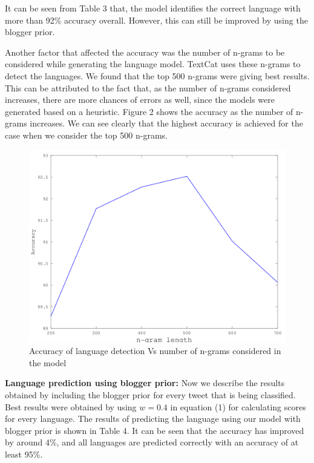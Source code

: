 \documentclass[11pt]{article}
\begin{document}
It can be seen from Table 3 that, the model identifies the correct language with more than 92\% accuracy overall. However, this can still be improved by using the blogger prior.

Another factor that affected the accuracy was the number of n-grams to be considered while generating the language model. TextCat uses these n-grams to detect the languages. We found that the top 500 n-grams were giving best results. This can be attributed to the fact that, as the number of n-grams considered increases, there are more chances of errors as well, since the models were generated based on a heuristic. Figure 2 shows the accuracy as the number of n-grams increases. We can see clearly that the highest accuracy is achieved for the case when we consider the top 500 n-grams.

\begin{figure}[ht]
\includegraphics[scale=0.35]{ngramVsAccuracy.png}
\caption{\footnotesize Accuracy of language detection Vs number of n-grams considered in the model}
\label{fig:s3}
\end{figure}


{\textbf {Language prediction using blogger prior: }} Now we describe the results obtained by including the blogger prior for every tweet that is being classified. Best results were obtained by using $w = 0.4$ in equation (1) for calculating scores for every language. The results of predicting the language using our model with blogger prior is shown in Table 4. It can be seen that the accuracy has improved by around 4\%, and all languages are predicted correctly with an accuracy of at least 95\%.
\end{document}
